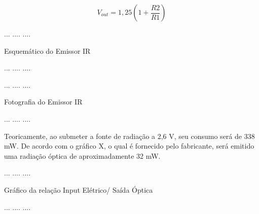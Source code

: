 \documentclass[oneside,openright,12pt]{ufsm_2021} %
\begin{document}
            \begin{equation}
            \label{eq:Vout_LM117}
                V_{out}=1,25(1+\frac{R2}{R1})
            \end{equation}

            \par ...    ....    ....
            \par Esquemático do Emissor IR
            \par ...    ....    ....

            \par ...    ....    ....
            \par Fotografia do Emissor IR
            \par ...    ....    ....

            \par Teoricamente, ao submeter a fonte de radiação a 2,6 V, seu consumo será de 338 mW. De acordo com o gráfico X, o qual é fornecido pelo fabricante, será emitido uma radiação óptica 
            de aproximadamente 32 mW.

            \par ...    ....    ....
            \par Gráfico da relação Input Elétrico/ Saída Óptica
            \par ...    ....    ....
            
\end{document}
